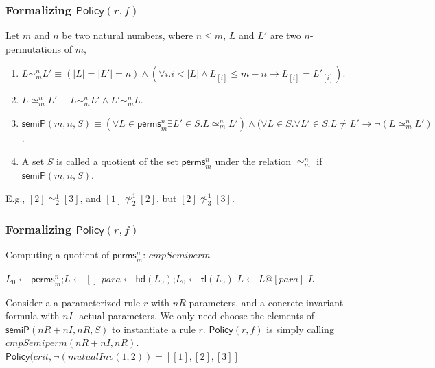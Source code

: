 \documentclass{beamer}
\begin{document}
 \begin{frame}\frametitle{Formalizing $\mathsf{Policy}(r,f)$}

Let $m$ and $n$ be two natural numbers, where $n \le m$,  $L$ and $L'$ are  two  $n$-permutations of $m$,
\begin{enumerate}%
\item
$L \sim_m^n L' \equiv (|L| =|L'|=n) \wedge (\forall i. i<|L| \wedge L_{[i]} \le m-n \longrightarrow L_{[i]}=L'_{[i]}) $.

\item $L \simeq_m^n L' \equiv L \sim_m^n L' \wedge   L' \sim_m^n L$.


\item $\mathsf{semiP}(m,n,S)\equiv (\forall  L \in \mathsf{perms}_{m}^{n} \exists  L' \in S. L \simeq_m^n L' ) \wedge (\forall  L\in S. \forall L'\in S. L \neq L' \longrightarrow \neg  (L \simeq_m^n L' )$.

\item    A set $S$ is called a quotient of the set $\mathsf{perms}_{m}^{n}$ under the relation $\simeq_m^n$ if    $\mathsf{semiP}(m,n,S)$.
\end{enumerate}
E.g., $[2 ] \simeq_2^1 [3]$, and $[1 ] \not\simeq_2^1 [2]$, but  $[2 ] \not\simeq_3^1 [3]$.


\end{frame}

\begin{frame}\frametitle{Formalizing $\mathsf{Policy}(r,f)$}
\begin{algorithm}[H]
\caption{Computing a quotient of $\mathsf{perms}_{m}^{n}$: $cmpSemiperm$ \label{alg:computeSemiPerms}}%



{
    $L_0\leftarrow \mathsf{perms}_m^n$;$L\leftarrow [] $\;
      {$para \leftarrow \mathsf{hd}(L_0)$;$L_0 \leftarrow \mathsf{tl}(L_0)$\;
        { $L\leftarrow L@[para]$\;}
      }
    \Return $L$\;
}


\end{algorithm}
Consider a a parameterized rule $r$ with $nR$-parameters, and a concrete invariant formula with $nI$- actual parameters. We only need choose the elements of $\mathsf{semiP}(nR+nI,nR,S)$ to instantiate a rule $r$.
$\mathsf{Policy}(r,f)$ is simply calling  $cmpSemiperm(nR+nI,nR)$.  $\mathsf{Policy}(crit,\neg(mutualInv(1,2))=[[1],[2],[3]]$
\end{frame}
\end{document}
